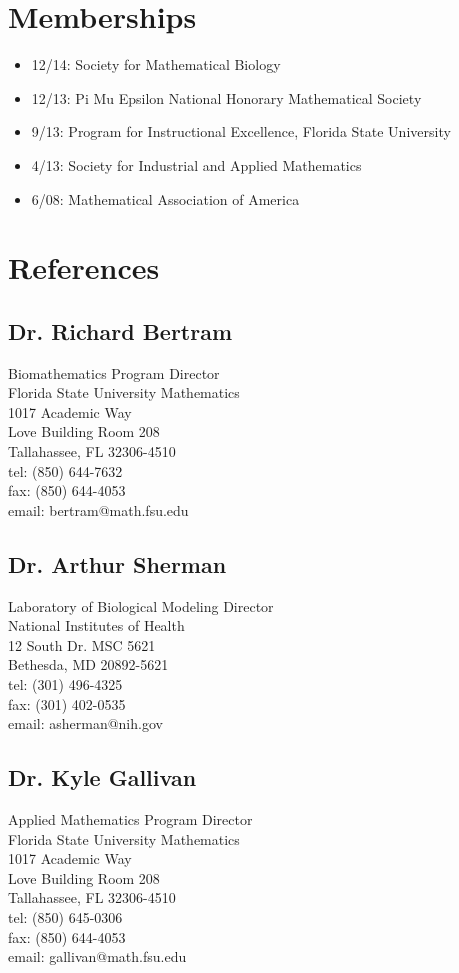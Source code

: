 \documentclass[11pt]{cv}
\begin{document}
\section*{Memberships}
\label{sec:orgheadline23}
\begin{itemize}
\item 12/14: Society for Mathematical Biology\\
\item 12/13: Pi Mu Epsilon National Honorary Mathematical Society\\
\item 9/13: Program for Instructional Excellence, Florida State University\\
\item 4/13: Society for Industrial and Applied Mathematics\\
\item 6/08: Mathematical Association of America\\
\end{itemize}
\section*{References}
\label{sec:orgheadline27}
\subsection*{Dr. Richard Bertram}
\label{sec:orgheadline24}
Biomathematics Program Director\\
Florida State University Mathematics\\
1017 Academic Way\\
Love Building Room 208\\
Tallahassee, FL 32306-4510\\
tel: (850) 644-7632\\
fax: (850) 644-4053\\
email: bertram@math.fsu.edu\\
\subsection*{Dr. Arthur Sherman}
\label{sec:orgheadline25}
Laboratory of Biological Modeling Director\\
National Institutes of Health\\
12 South Dr. MSC 5621\\
Bethesda, MD 20892-5621\\
tel: (301) 496-4325\\
fax: (301) 402-0535\\
email: asherman@nih.gov\\
\subsection*{Dr. Kyle Gallivan}
\label{sec:orgheadline26}
Applied Mathematics Program Director\\
Florida State University Mathematics\\
1017 Academic Way\\
Love Building Room 208\\
Tallahassee, FL 32306-4510\\
tel: (850) 645-0306\\
fax: (850) 644-4053\\
email: gallivan@math.fsu.edu\\
\end{document}

